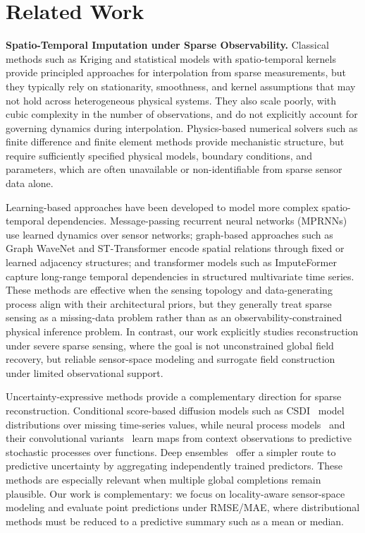 \section{Related Work}

\noindent\textbf{Spatio-Temporal Imputation under Sparse Observability.}
Classical methods such as Kriging \citep{cressie1990origins} and statistical models with spatio-temporal kernels \citep{wikle2019spatio,de2005predictive} provide principled approaches for interpolation from sparse measurements, but they typically rely on stationarity, smoothness, and kernel assumptions that may not hold across heterogeneous physical systems. They also scale poorly, with cubic complexity in the number of observations, and do not explicitly account for governing dynamics during interpolation. Physics-based numerical solvers such as finite difference and finite element methods \citep{leveque2007finite,hughes2003finite} provide mechanistic structure, but require sufficiently specified physical models, boundary conditions, and parameters, which are often unavailable or non-identifiable from sparse sensor data alone.

Learning-based approaches have been developed to model more complex spatio-temporal dependencies. Message-passing recurrent neural networks (MPRNNs) \citep{iyer2022modeling} use learned dynamics over sensor networks; graph-based approaches such as Graph WaveNet \citep{wu2019graph} and ST-Transformer \citep{xu2020spatial} encode spatial relations through fixed or learned adjacency structures; and transformer models such as ImputeFormer \citep{nie2024imputeformer} capture long-range temporal dependencies in structured multivariate time series. These methods are effective when the sensing topology and data-generating process align with their architectural priors, but they generally treat sparse sensing as a missing-data problem rather than as an observability-constrained physical inference problem. In contrast, our work explicitly studies reconstruction under severe sparse sensing, where the goal is not unconstrained global field recovery, but reliable sensor-space modeling and surrogate field construction under limited observational support.

Uncertainty-expressive methods provide a complementary direction for sparse reconstruction. Conditional score-based diffusion models such as CSDI~\citep{tashiro2021csdi} model distributions over missing time-series values, while neural process models~\citep{garnelo2018conditional} and their convolutional variants~\citep{gordon2020convolutional,foong2020meta} learn maps from context observations to predictive stochastic processes over functions. Deep ensembles~\citep{lakshminarayanan2017simple} offer a simpler route to predictive uncertainty by aggregating independently trained predictors. These methods are especially relevant when multiple global completions remain plausible. Our work is complementary: we focus on locality-aware sensor-space modeling and evaluate point predictions under RMSE/MAE, where distributional methods must be reduced to a predictive summary such as a mean or median.

